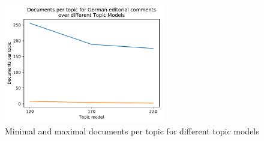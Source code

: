 \begin{figure}[t]
\begin{minipage}{0.5\textwidth}
	\end{minipage}%
	\centering
	\begin{minipage}{0.5\textwidth}
		\includegraphics[width=7cm]{gfx/Eval_IC/German_comments_Doc_per_topic.pdf}
	\end{minipage}
	\caption[]{Minimal and maximal documents per topic for different topic models}
\end{figure}




